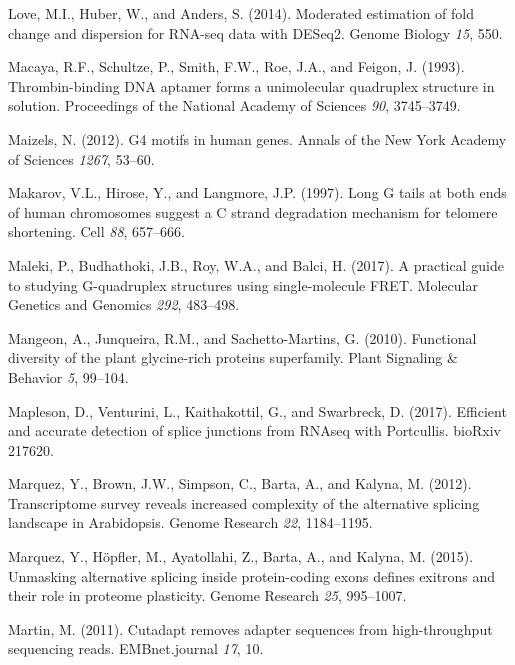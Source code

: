 \documentclass[12pt,a4paper,]{report}
\begin{document}
\leavevmode\hypertarget{ref-Love2014}{}%
Love, M.I., Huber, W., and Anders, S. (2014). Moderated estimation of
fold change and dispersion for RNA-seq data with DESeq2. Genome Biology
\emph{15}, 550.

\leavevmode\hypertarget{ref-Macaya1993}{}%
Macaya, R.F., Schultze, P., Smith, F.W., Roe, J.A., and Feigon, J.
(1993). Thrombin-binding DNA aptamer forms a unimolecular quadruplex
structure in solution. Proceedings of the National Academy of Sciences
\emph{90}, 3745--3749.

\leavevmode\hypertarget{ref-Maizels2012}{}%
Maizels, N. (2012). G4 motifs in human genes. Annals of the New York
Academy of Sciences \emph{1267}, 53--60.

\leavevmode\hypertarget{ref-Makarov1997}{}%
Makarov, V.L., Hirose, Y., and Langmore, J.P. (1997). Long G tails at
both ends of human chromosomes suggest a C strand degradation mechanism
for telomere shortening. Cell \emph{88}, 657--666.

\leavevmode\hypertarget{ref-Maleki2017}{}%
Maleki, P., Budhathoki, J.B., Roy, W.A., and Balci, H. (2017). A
practical guide to studying G-quadruplex structures using
single-molecule FRET. Molecular Genetics and Genomics \emph{292},
483--498.

\leavevmode\hypertarget{ref-Mangeon2010}{}%
Mangeon, A., Junqueira, R.M., and Sachetto-Martins, G. (2010).
Functional diversity of the plant glycine-rich proteins superfamily.
Plant Signaling \& Behavior \emph{5}, 99--104.

\leavevmode\hypertarget{ref-Mapleson2017}{}%
Mapleson, D., Venturini, L., Kaithakottil, G., and Swarbreck, D. (2017).
Efficient and accurate detection of splice junctions from RNAseq with
Portcullis. bioRxiv 217620.

\leavevmode\hypertarget{ref-Marquez2012}{}%
Marquez, Y., Brown, J.W., Simpson, C., Barta, A., and Kalyna, M. (2012).
Transcriptome survey reveals increased complexity of the alternative
splicing landscape in Arabidopsis. Genome Research \emph{22},
1184--1195.

\leavevmode\hypertarget{ref-Marquez2015}{}%
Marquez, Y., Höpfler, M., Ayatollahi, Z., Barta, A., and Kalyna, M.
(2015). Unmasking alternative splicing inside protein-coding exons
defines exitrons and their role in proteome plasticity. Genome Research
\emph{25}, 995--1007.

\leavevmode\hypertarget{ref-Martin2011}{}%
Martin, M. (2011). Cutadapt removes adapter sequences from
high-throughput sequencing reads. EMBnet.journal \emph{17}, 10.
\end{document}

